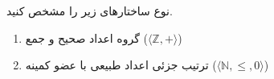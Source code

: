 نوع ساختارهای زیر را مشخص کنید.
\begin{enumerate}[label=(\alph*)]
  \item گروه اعداد صحیح و جمع ($\langle\mathbb{Z}, +\rangle$)
  \item ترتیب جزئی اعداد طبیعی با عضو کمینه ($\langle\mathbb{N}, \leq, 0\rangle$)
\end{enumerate}